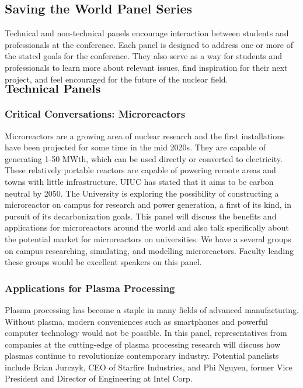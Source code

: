 \subsection{Saving the World Panel Series}
Technical and non-technical panels encourage interaction between students and professionals at the conference. Each panel is designed to address one or more of the stated goals for the conference. They also serve as a way for students and professionals to learn more about relevant issues, find inspiration for their next project, and feel encouraged for the future of the nuclear field.\\
 
$\Large\textbf{Technical Panels}$

\subsubsection{Critical Conversations: Microreactors}
Microreactors are a growing area of nuclear research and the first installations have been projected for some time in the mid 2020s. They are capable of generating 1-50 MWth, which can be used directly or converted to electricity. These relatively portable reactors are capable of powering remote areas and towns with little infrastructure. UIUC has stated that it aims to be carbon neutral by 2050. The University is exploring the possibility of constructing a microreactor on campus for research and power generation, a first of its kind, in pursuit of its decarbonization goals. This panel will discuss the benefits and applications for microreactors around the world and also talk specifically about the potential market for microreactors on universities. We have a several groups on campus researching, simulating, and modelling microreactors. Faculty leading these groups would be excellent speakers on this panel.


\subsubsection{Applications for Plasma Processing}
Plasma processing has become a staple in many fields of advanced manufacturing. Without plasma, modern conveniences such as smartphones and powerful computer technology would not be possible. In this panel, representatives from companies at the cutting-edge of plasma processing research will discuss how plasmas continue to revolutionize contemporary industry. Potential panelists include Brian Jurczyk, CEO of Starfire Industries, and Phi Nguyen, former Vice President and Director of Engineering at Intel Corp.


